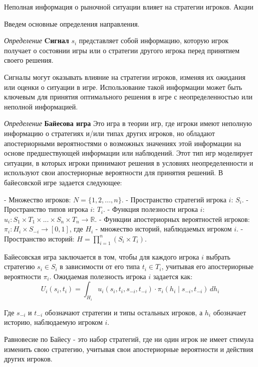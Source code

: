 Неполная информация о рыночной ситуации влияет на стратегии игроков. Акции \cite{}

Введем основные определения направления. 

\textit{Определение} \textbf{Cигнал} $s_i$ представляет собой информацию, которую игрок получает о состоянии игры или о стратегии другого игрока перед принятием своего решения. 

Сигналы могут оказывать влияние на стратегии игроков, изменяя их ожидания или оценки о ситуации в игре. Использование такой информации может быть ключевым для принятия оптимального решения в игре с неопределенностью или неполной информацией.




\textit{Определение} \textbf{Байесова игра}\cite{harsanyi1967games} \cite{harsanyi1968games}\cite{harsanyi1968bayesian} Это игра в теории игр, где игроки имеют неполную информацию о стратегиях и/или типах других игроков, но обладают апостериорными вероятностями о возможных значениях этой информации на основе предшествующей информации или наблюдений. Этот тип игр моделирует ситуации, в которых игроки принимают решения в условиях неопределенности и используют свои апостериорные вероятности для принятия решений.
В байесовской игре задается следующее:


- Множество игроков: \( N = \{1, 2, ..., n\} \).
- Пространство стратегий игрока \(i\): \(S_i\).
- Пространство типов игрока \(i\): \(T_i\).
- Функция полезности игрока \(i\): \(u_i: S_1 \times T_1 \times ... \times S_n \times T_n \rightarrow \mathbb{R}\).
- Функции апостериорных вероятностей игроков: \(\pi_i: H_i \times S_{-i} \rightarrow [0, 1]\), где \(H_i\) - множество историй, наблюдаемых игроком \(i\).
- Пространство историй: \(H = \prod_{i=1}^{n} (S_i \times T_i)\).


Байесовская игра заключается в том, чтобы для каждого игрока \(i\) выбрать стратегию \(s_i \in S_i\) в зависимости от его типа \(t_i \in T_i\), учитывая его апостериорные вероятности \(\pi_i\). Ожидаемая полезность игрока \(i\) задается как:
\[ U_i(s_i, t_i) = \int_{H_i} u_i(s_i, t_i, s_{-i}, t_{-i}) \cdot \pi_i(h_i \mid s_{-i}, t_{-i}) \, dh_i \]


Где \(s_{-i}\) и \(t_{-i}\) обозначают стратегии и типы остальных игроков, а \(h_i\) обозначает историю, наблюдаемую игроком \(i\).


Равновесие по Байесу - это набор стратегий, где ни один игрок не имеет стимула изменить свою стратегию, учитывая свои апостериорные вероятности и действия других игроков.
